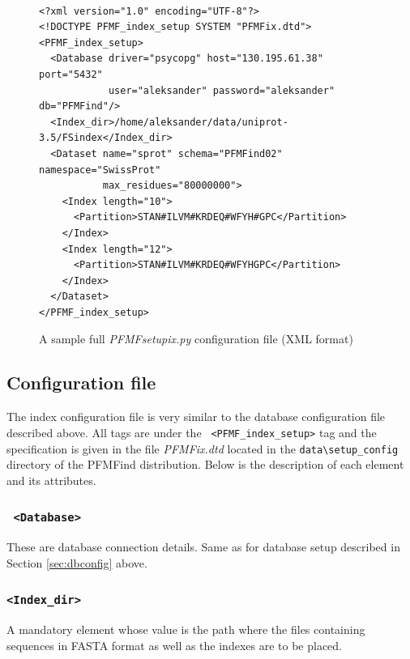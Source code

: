 \documentclass[10pt,letter]{article}
\begin{document}
\begin{figure}[h!]
\begin{mdframed}
{\small
\begin{verbatim}

<?xml version="1.0" encoding="UTF-8"?>
<!DOCTYPE PFMF_index_setup SYSTEM "PFMFix.dtd">
<PFMF_index_setup>
  <Database driver="psycopg" host="130.195.61.38" port="5432"
            user="aleksander" password="aleksander" db="PFMFind"/>
  <Index_dir>/home/aleksander/data/uniprot-3.5/FSindex</Index_dir>
  <Dataset name="sprot" schema="PFMFind02" namespace="SwissProt"
           max_residues="80000000">
    <Index length="10">
      <Partition>STAN#ILVM#KRDEQ#WFYH#GPC</Partition>
    </Index>
    <Index length="12">
      <Partition>STAN#ILVM#KRDEQ#WFYHGPC</Partition>
    </Index>
  </Dataset>
</PFMF_index_setup>
\end{verbatim}
\caption{A sample full {\it PFMFsetupix.py} configuration file (XML format)}\label{fig:ixconfig}
}
\end{mdframed}
\end{figure}

\subsection{Configuration file}\label{sec:ixconfig}

The index configuration file is very similar to the database configuration file described above. All tags are under the \texttt{ <PFMF\_index\_setup>} tag and the specification is given in the file {\it PFMFix.dtd} located in the \verb|data\setup_config| directory of the PFMFind distribution. Below is the description of each element and its attributes.

\subsubsection*{\texttt{ <Database>}}

These are database connection details. Same as for database setup described in Section \ref{sec:dbconfig} above.

\subsubsection*{\texttt{<Index\_dir>}}

A mandatory element whose value is the path where the files containing sequences in FASTA format as well as the indexes are to be placed.
\end{document}
